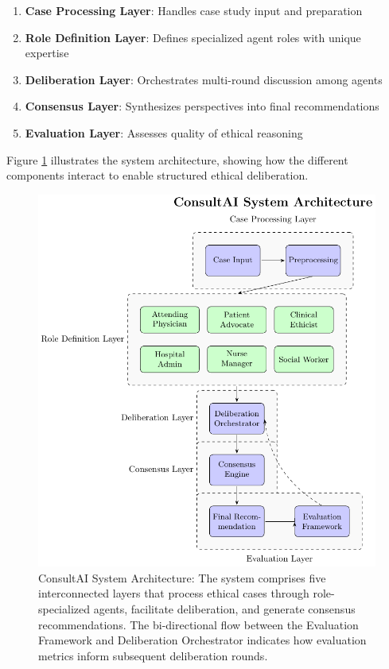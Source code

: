 \documentclass[11pt]{article}
\begin{document}
\begin{enumerate}
    \item \textbf{Case Processing Layer}: Handles case study input and preparation
    \item \textbf{Role Definition Layer}: Defines specialized agent roles with unique expertise
    \item \textbf{Deliberation Layer}: Orchestrates multi-round discussion among agents
    \item \textbf{Consensus Layer}: Synthesizes perspectives into final recommendations
    \item \textbf{Evaluation Layer}: Assesses quality of ethical reasoning
\end{enumerate}

Figure \ref{fig:architecture} illustrates the system architecture, showing how the different components interact to enable structured ethical deliberation.

\begin{figure}[t!]
    \centering
    \includegraphics[width=\linewidth]{system_architecture.pdf}
    \caption{ConsultAI System Architecture: The system comprises five interconnected layers that process ethical cases through role-specialized agents, facilitate deliberation, and generate consensus recommendations. The bi-directional flow between the Evaluation Framework and Deliberation Orchestrator indicates how evaluation metrics inform subsequent deliberation rounds.}
    \label{fig:architecture}
\end{figure}
\end{document}
